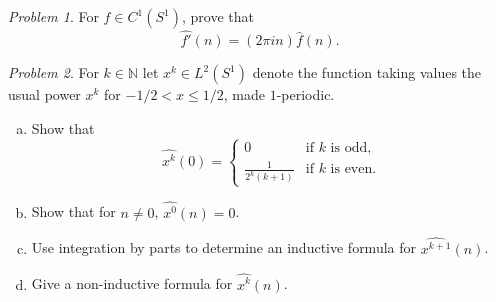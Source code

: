 \documentclass[11pt,twoside]{amsart}
\theoremstyle{plain}
\theoremstyle{remark}
\newtheorem{prob}{Problem}
\theoremstyle{definition}
\theoremstyle{definition}
\newcommand{\NN}{\mathbb{N}}
\begin{document}

\begin{prob}
For $f\in C^1(S^1)$, prove that
\[
  \widehat{f'}(n) = (2\pi i n)\hat f(n).
\]
\end{prob}


\begin{prob}
For $k\in \NN$ let $x^k\in L^2(S^1)$ denote the function taking values the usual power $x^k$ for $-1/2<x\le 1/2$, made $1$-periodic.
\begin{enumerate}[(a)]
\item Show that
\[
  \widehat{x^k}(0) =
  \begin{cases}
  0 &\text{if $k$ is odd},\\
  \frac{1}{2^{k}(k+1)} &\text{if $k$ is even}.
  \end{cases}
\]
\item Show that for $n\ne 0$, $\widehat{x^0}(n) = 0$.
\item Use integration by parts to determine an inductive formula for $\widehat{x^{k+1}}(n)$.
\item Give a non-inductive formula for $\widehat{x^k}(n)$.
\end{enumerate}
\end{prob}

\end{document}
